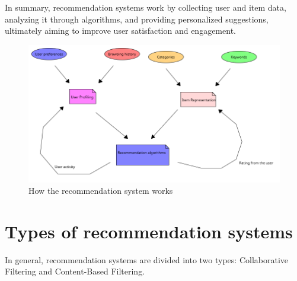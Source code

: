 \documentclass[10pt,twoside,slovak,a4paper]{article}
\begin{document}
In summary, recommendation systems work by collecting user and item data, analyzing it through algorithms, and providing personalized suggestions, ultimately aiming to improve user satisfaction and engagement.



 \begin{figure}[!h]
    \centering
    \includegraphics[width=1\linewidth]{Diagram 2.png}
    \caption{How the recommendation system works}
    \label{fig:picture}
\end{figure}
 


\newpage
\section{Types of recommendation systems} \label{Types of recommendation systems}

In general, recommendation systems are divided into two types: Collaborative Filtering and Content-Based Filtering.
\end{document}
